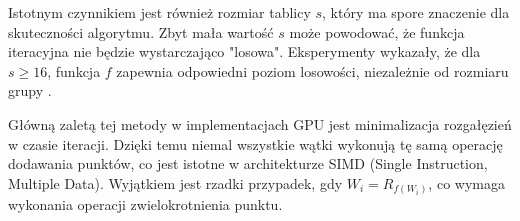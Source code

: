Istotnym czynnikiem jest również rozmiar tablicy $s$, który ma spore znaczenie
dla skuteczności algorytmu. Zbyt mała 
wartość $s$ może powodować, że funkcja iteracyjna nie będzie wystarczająco 
"losowa". Eksperymenty wykazały, że dla $s \geq 16$, funkcja $f$ zapewnia 
odpowiedni poziom losowości, niezależnie od rozmiaru grupy \cite{Teske2000}.

Główną zaletą tej metody w implementacjach GPU jest minimalizacja rozgałęzień 
w czasie iteracji. Dzięki temu niemal wszystkie wątki wykonują tę samą operację 
dodawania punktów, co jest istotne w architekturze SIMD (Single Instruction, 
Multiple Data). Wyjątkiem jest rzadki przypadek, gdy $W_i = R_{f(W_i)}$, co 
wymaga wykonania operacji zwielokrotnienia punktu.
